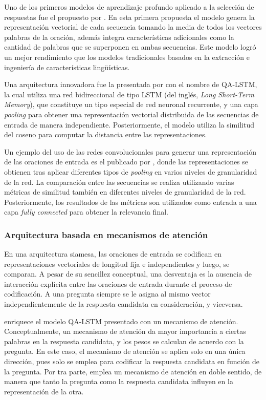 Uno de los primeros modelos de aprendizaje profundo aplicado a la selección de respuestas fue el propuesto por \cite{2014-yu-answer-sentence}. En esta primera propuesta el modelo genera la representación vectorial de cada secuencia tomando la media de todos los vectores palabras de la oración, además integra características adicionales como la cantidad de palabras que se superponen en ambas secuencias. Este modelo logró un mejor rendimiento que los modelos tradicionales basados en la extracción e ingeniería de características lingüísticas.

Una arquitectura innovadora fue la presentada por \cite{2015-tan-qalstm} con el nombre de QA-LSTM, la cual utiliza una red bidireccional de tipo LSTM (del inglés, \textit{Long Short-Term Memory}), que constituye un tipo especial de red neuronal recurrente, y una capa \textit{pooling} para obtener una representación vectorial distribuida de las secuencias de entrada de manera independiente. Posteriormente, el modelo utiliza la similitud del coseno para computar la distancia entre las representaciones. 

Un ejemplo del uso de las redes convolucionales para generar una representación de las oraciones de entrada es el publicado por \cite{2015-moschitti-cnn}, donde las representaciones se obtienen tras aplicar diferentes tipos de \textit{pooling} en varios niveles de granularidad de la red. La comparación entre las secuencias se realiza utilizando varias métricas de similitud también en diferentes niveles de granularidad de la red. Posteriormente, los resultados de las métricas son utilizados como entrada a una capa \textit{fully connected} para obtener la relevancia final. 

\subsubsection{Arquitectura basada en mecanismos de atención}

En una arquitectura siamesa, las oraciones de entrada se codifican en representaciones vectoriales de longitud fija e independientes y luego, se comparan. A pesar de su sencillez conceptual, una desventaja es la ausencia de interacción explícita entre las oraciones de entrada durante el proceso de codificación. A una pregunta siempre se le asigna al mismo vector independientemente de la respuesta candidata en consideración, y viceversa. 

\cite{2015-tan-qalstm} enriquece el modelo QA-LSTM presentado con un mecanismo de atención. 
Conceptualmente, un mecanismo de atención da mayor importancia a ciertas palabras en la respuesta candidata, y los pesos se calculan de acuerdo con la pregunta. En este caso, el mecanismo de atención se aplica solo en una única dirección, pues solo se emplea para codificar la respuesta candidata en función de la pregunta. Por tra parte, \cite{2016-santos-attentive} emplea un mecanismo de atención en doble sentido, de manera que tanto la pregunta como la respuesta candidata influyen en la representación de la otra.  

